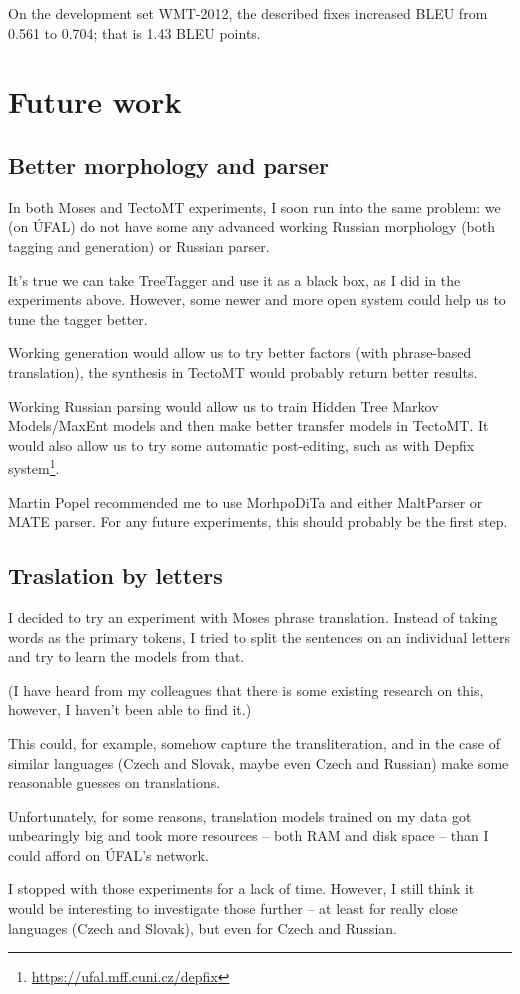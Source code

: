 On the development set WMT-2012, the described fixes increased BLEU from 0.561 to 0.704; that is 1.43 BLEU points.
\section{Future work}
\subsection{Better morphology and parser}
\label{future:morpho}
In both Moses and TectoMT experiments, I soon run into the same problem: we (on ÚFAL) do not have some any advanced working Russian morphology (both tagging and generation) or Russian parser.

It's true we can take TreeTagger and use it as a black box, as I did in the experiments above. 
However, some newer and more open system could help us to tune the tagger better. 

Working generation would allow us to try better factors (with phrase-based translation), the synthesis in TectoMT would probably return better results.

Working Russian parsing would allow us to train Hidden Tree Markov Models/MaxEnt models and then make better transfer models in TectoMT. It would also allow us to try some automatic post-editing, such as with Depfix system\footnote{\url{https://ufal.mff.cuni.cz/depfix}}.

Martin Popel recommended me to use MorhpoDiTa and either MaltParser or MATE parser. For any future experiments, this should probably be the first step.

\subsection{Traslation by letters}
I decided to try an experiment with Moses phrase translation. Instead of taking words as the primary tokens, I tried to split the sentences on an individual letters and try to learn the models from that.

(I have heard from my colleagues that there is some existing research on this, however, I haven't been able to find it.)

This could, for example, somehow capture the transliteration, and in the case of similar languages (Czech and Slovak, maybe even Czech and Russian) make some reasonable guesses on translations.

Unfortunately, for some reasons, translation models trained on my data got unbearingly big and took more resources -- both RAM and disk space -- than I could afford on ÚFAL's network. 

I stopped with those experiments for a lack of time. However, I still think it would be interesting to investigate those further -- at least for really close languages (Czech and Slovak), but even for Czech and Russian.
